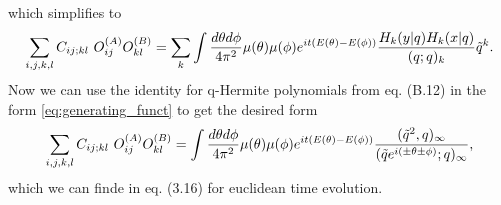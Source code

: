\documentclass{scrarticle}
\begin{document}
which simplifies to
\begin{align}
    \sum_{i,j, k, l} C_{ij;kl} \ O_{ij}^{(A)} O_{kl}^{(B)} 
    = \sum_{k} \int \frac{d\theta d\phi}{4 \pi^2} \mu(\theta) \mu(\phi) e^{i t(E(\theta) - E(\phi))} \frac{H_k(y|q) H_k(x|q)}{(q;q)_k} \Tilde{q}^k.
 \end{align}
Now we can use the identity for q-Hermite polynomials from \cite{berkooz_towards_2018} eq. (B.12) in the form \ref{eq:generating_funct} to get the desired form
\begin{align}
     \sum_{i,j, k, l} C_{ij;kl} \ O_{ij}^{(A)} O_{kl}^{(B)} =
     \int \frac{d\theta d\phi}{4 \pi^2} \mu(\theta) \mu(\phi) e^{i t(E(\theta) - E(\phi))} \frac{(\Tilde{q}^2, q)_\infty}{(\Tilde{q} e^{i(\pm \theta \pm \phi)}; q)_\infty},
\end{align}
which we can finde in \cite{berkooz_towards_2018} eq. (3.16) for euclidean time evolution.
\end{document}

